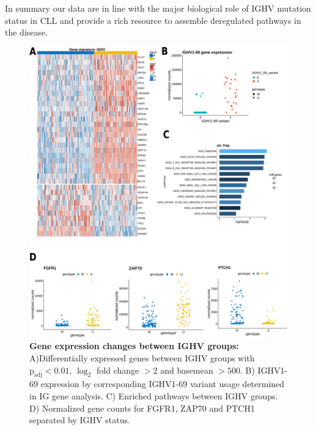 In summary our data are in line with the major biological role of IGHV mutation status in CLL and provide a rich resource to assemble deregulated pathways in the disease.



\begin{figure}
	\centering
	\includegraphics[width=\columnwidth]{figures/gene_summary_IGHV.pdf}
	\caption{\textbf{Gene expression changes between IGHV groups:} A)Differentially expressed genes between IGHV groups with $\text{p}_\text{adj} < 0.01$, $\log_2$ fold change $>2$ and basemean $> 500$. B) IGHV1-69 expression by corresponding IGHV1-69 variant usage determined in IG gene analysis. C) Enriched pathways between IGHV groups. D) Normalized gene counts for FGFR1, ZAP70 and PTCH1 separated by IGHV status.}
	\label{fig:IGHV_expression}
\end{figure}

\clearpage

